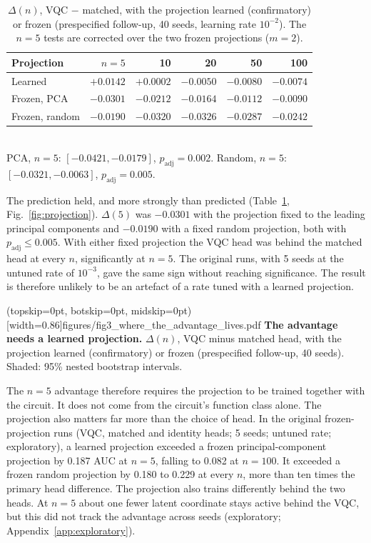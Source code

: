 \documentclass{ieeeaccess}
\newcommand{\vqc}{VQC}
\begin{document}
\begin{table}[t]
\caption{$\Delta(n)$, \vqc{} $-$ matched, with the projection learned (confirmatory) or frozen (prespecified follow-up, 40 seeds, learning rate $10^{-2}$). The $n=5$ tests are corrected over the two frozen projections ($m=2$).}
\label{tab:hs6f}
\centering
\setlength{\tabcolsep}{3pt}
\footnotesize
\begin{tabular}{@{}lrrrrr@{}}
\toprule
Projection & $n=5$ & 10 & 20 & 50 & 100\\
\midrule
Learned & $+0.0142$ & $+0.0002$ & $-0.0050$ & $-0.0080$ & $-0.0074$\\
Frozen, PCA & $-0.0301$ & $-0.0212$ & $-0.0164$ & $-0.0112$ & $-0.0090$\\
Frozen, random & $-0.0190$ & $-0.0320$ & $-0.0326$ & $-0.0287$ & $-0.0242$\\
\bottomrule
\end{tabular}
\\[2pt]{\scriptsize PCA, $n=5$: $[-0.0421,-0.0179]$, $p_{\mathrm{adj}}=0.002$. Random, $n=5$: $[-0.0321,-0.0063]$, $p_{\mathrm{adj}}=0.005$.}
\end{table}

The prediction held, and more strongly than predicted (Table~\ref{tab:hs6f}, Fig.~\ref{fig:projection}). $\Delta(5)$ was $-0.0301$ with the projection fixed to the leading principal components and $-0.0190$ with a fixed random projection, both with $p_{\mathrm{adj}}\le0.005$. With either fixed projection the \vqc{} head was behind the matched head at every $n$, significantly at $n=5$. The original runs, with 5 seeds at the untuned rate of $10^{-3}$, gave the same sign without reaching significance. The result is therefore unlikely to be an artefact of a rate tuned with a learned projection.

\Figure[t!](topskip=0pt, botskip=0pt, midskip=0pt)[width=0.86\columnwidth]{figures/fig3_where_the_advantage_lives.pdf}
{\textbf{The advantage needs a learned projection.} $\Delta(n)$, \vqc{} minus matched head, with the projection learned (confirmatory) or frozen (prespecified follow-up, 40 seeds). Shaded: 95\% nested bootstrap intervals.\label{fig:projection}}

The $n=5$ advantage therefore requires the projection to be trained together with the circuit. It does not come from the circuit's function class alone. The projection also matters far more than the choice of head. In the original frozen-projection runs (\vqc{}, matched and identity heads; 5 seeds; untuned rate; exploratory), a learned projection exceeded a frozen principal-component projection by 0.187 AUC at $n=5$, falling to 0.082 at $n=100$. It exceeded a frozen random projection by 0.180 to 0.229 at every $n$, more than ten times the primary head difference. The projection also trains differently behind the two heads. At $n=5$ about one fewer latent coordinate stays active behind the \vqc{}, but this did not track the advantage across seeds (exploratory; Appendix~\ref{app:exploratory}).
\end{document}
